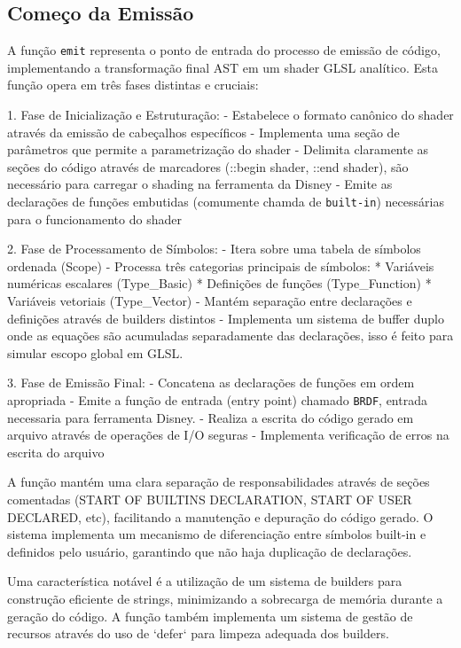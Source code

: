 \subsection{Começo da Emissão}%
\label{sub:start-emitting}

A função \verb`emit` representa o ponto de entrada do processo de emissão de código, implementando a transformação final AST em um shader GLSL analítico. Esta função opera em três fases distintas e cruciais:

1. Fase de Inicialização e Estruturação:
   - Estabelece o formato canônico do shader através da emissão de cabeçalhos específicos
   - Implementa uma seção de parâmetros que permite a parametrização do shader
   - Delimita claramente as seções do código através de marcadores (::begin shader, ::end shader), são necessário para carregar o shading na ferramenta da Disney
   - Emite as declarações de funções embutidas (comumente chamda de \verb`built-in`) necessárias para o funcionamento do shader

2. Fase de Processamento de Símbolos:
   - Itera sobre uma tabela de símbolos ordenada (Scope)
   - Processa três categorias principais de símbolos:
     * Variáveis numéricas escalares (Type_Basic)
     * Definições de funções (Type_Function)
     * Variáveis vetoriais (Type_Vector)
   - Mantém separação entre declarações e definições através de builders distintos
   - Implementa um sistema de buffer duplo onde as equações são acumuladas separadamente das declarações, isso é feito para simular escopo global em GLSL.

3. Fase de Emissão Final:
   - Concatena as declarações de funções em ordem apropriada
   - Emite a função de entrada (entry point) chamado \verb`BRDF`, entrada necessaria para ferramenta Disney.
   - Realiza a escrita do código gerado em arquivo através de operações de I/O seguras
   - Implementa verificação de erros na escrita do arquivo

A função mantém uma clara separação de responsabilidades através de seções comentadas (START OF BUILTINS DECLARATION, START OF USER DECLARED, etc), facilitando a manutenção e depuração do código gerado. O sistema implementa um mecanismo de diferenciação entre símbolos built-in e definidos pelo usuário, garantindo que não haja duplicação de declarações.

Uma característica notável é a utilização de um sistema de builders para construção eficiente de strings, minimizando a sobrecarga de memória durante a geração do código. A função também implementa um sistema de gestão de recursos através do uso de `defer` para limpeza adequada dos builders.

